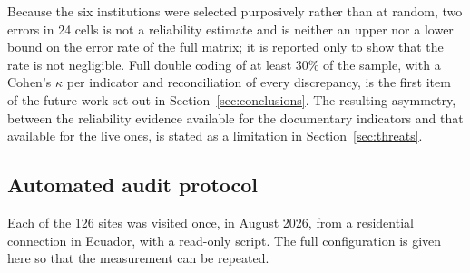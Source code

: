 \documentclass[pdflatex,sn-basic,Numbered,iicol]{sn-jnl}
\theoremstyle{thmstyleone}
\theoremstyle{thmstyletwo}
\theoremstyle{thmstylethree}
\begin{document}
	Because the six institutions were selected purposively rather than at random, two errors in 24 cells is not a reliability estimate and is neither an upper nor a lower bound on the error rate of the full matrix; it is reported only to show that the rate is not negligible. Full double coding of at least 30\% of the sample, with a Cohen's $\kappa$ per indicator and reconciliation of every discrepancy, is the first item of the future work set out in Section~\ref{sec:conclusions}. The resulting asymmetry, between the reliability evidence available for the documentary indicators and that available for the live ones, is stated as a limitation in Section~\ref{sec:threats}.
	
	\subsection{Automated audit protocol}\label{sec:methods-audit}
	
	Each of the 126 sites was visited once, in August 2026, from a residential connection in Ecuador, with a read-only script. The full configuration is given here so that the measurement can be repeated.
	
\end{document}
